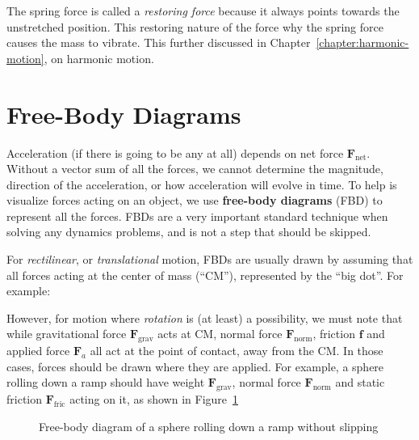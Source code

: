 The spring force is called a \emph{restoring force} because it always points
towards the unstretched position. This restoring nature of the force why the
spring force causes the mass to vibrate. This further discussed in
Chapter~\ref{chapter:harmonic-motion}, on harmonic motion.


\section{Free-Body Diagrams}

Acceleration (if there is going to be any at all) depends on net force
$\bm F_\text{net}$. Without a vector sum of all the forces, we cannot determine
the magnitude, direction of the acceleration, or how acceleration will evolve
in time. To help is visualize forces acting on an object, we use
\textbf{free-body diagrams} (FBD) to represent all the forces. FBDs are a very
important standard technique when solving any dynamics problems, and is not
a step that should be skipped.

For \emph{rectilinear}, or \emph{translational} motion, FBDs are usually drawn
by assuming that all forces acting at the center of mass (``CM''),
represented by the ``big dot''. For example:
\begin{figure}[ht]
  \centering
\end{figure}

However, for motion where \emph{rotation} is (at least) a possibility, we
must note that while gravitational force $\bm F_\text{grav}$ acts at CM, normal
force $\bm F_\text{norm}$, friction $\bm f$ and applied force $\bm F_a$ all act
at the point of contact, away from the CM. In those cases, forces should be
drawn where they are applied. For example, a sphere rolling down a ramp should
have weight $\bm F_\text{grav}$, normal force $\bm F_\text{norm}$ and static
friction $\bm F_\text{fric}$ acting on it, as shown in
Figure~\ref{fig:rollingdown1}
\begin{figure}[ht]
  \centering
  \caption{Free-body diagram of a sphere rolling down a ramp without slipping}
  \label{fig:rollingdown1}
\end{figure}

